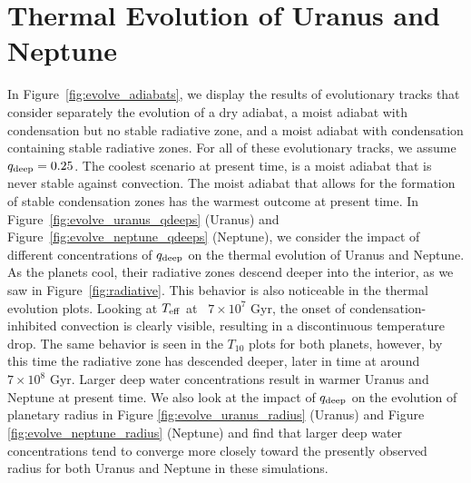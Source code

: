 \documentclass[11pt]{ucscthesisbs}
\begin{document}
\section{Thermal Evolution of Uranus and Neptune}

In Figure~\ref{fig:evolve_adiabats}, we display the results of evolutionary tracks that consider separately the evolution of a dry adiabat, a moist adiabat with condensation but no stable radiative zone, and a moist adiabat with condensation containing stable radiative zones. For all of these evolutionary tracks, we assume $q_{\rm deep} = 0.25$. The coolest scenario at present time, is a moist adiabat that is never stable against convection. The moist adiabat that allows for the formation of stable condensation zones has the warmest outcome at present time. In Figure~\ref{fig:evolve_uranus_qdeeps} (Uranus) and Figure~\ref{fig:evolve_neptune_qdeeps} (Neptune), we consider the impact of different concentrations of $q_{\rm deep}$ on the thermal evolution of Uranus and Neptune. As the planets cool, their radiative zones descend deeper into the interior, as we saw in Figure~\ref{fig:radiative}. This behavior is also noticeable in the thermal evolution plots. Looking at $T_{\rm eff}$ at ~$7 \times 10^7$ Gyr, the onset of condensation-inhibited convection is clearly visible, resulting in a discontinuous temperature drop. The same behavior is seen in the $T_{10}$ plots for both planets, however, by this time the radiative zone has descended deeper, later in time at around ~$7 \times 10^8$ Gyr. Larger deep water concentrations result in warmer Uranus and Neptune at present time. We also look at the impact of $q_{\rm deep}$ on the evolution of planetary radius in Figure \ref{fig:evolve_uranus_radius} (Uranus) and Figure \ref{fig:evolve_neptune_radius} (Neptune) and find that larger deep water concentrations tend to converge more closely toward the presently observed radius for both Uranus and Neptune in these simulations. 
\end{document}

